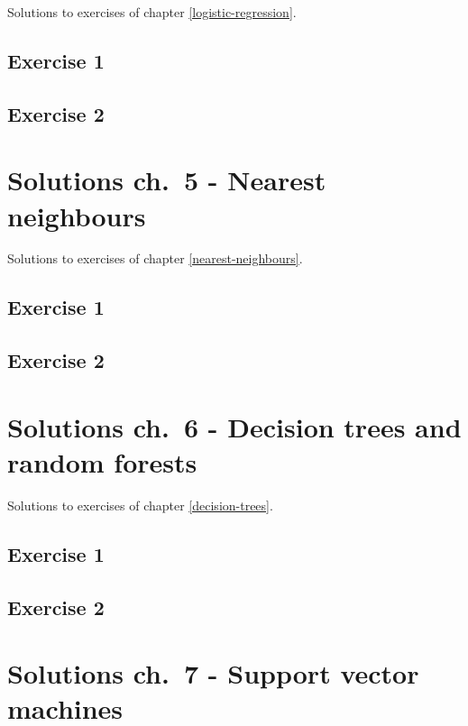 \documentclass[]{book}
\theoremstyle{definition}
\theoremstyle{definition}
\theoremstyle{definition}
\theoremstyle{remark}
\begin{document}
Solutions to exercises of chapter \ref{logistic-regression}.

\section{Exercise 1}\label{exercise-1-1}

\section{Exercise 2}\label{exercise-2-1}

\chapter{Solutions ch.~5 - Nearest
neighbours}\label{solutions-nearest-neighbours}

Solutions to exercises of chapter \ref{nearest-neighbours}.

\section{Exercise 1}\label{exercise-1-2}

\section{Exercise 2}\label{exercise-2-2}

\chapter{Solutions ch.~6 - Decision trees and random
forests}\label{solutions-decision-trees}

Solutions to exercises of chapter \ref{decision-trees}.

\section{Exercise 1}\label{exercise-1-3}

\section{Exercise 2}\label{exercise-2-3}

\chapter{Solutions ch.~7 - Support vector machines}\label{solutions-svm}
\end{document}

